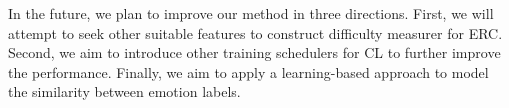 \documentclass[letterpaper]{article} \usepackage{aaai22}  \usepackage{times}  \usepackage{helvet}  \usepackage{courier}  \usepackage[hyphens]{url}  \usepackage{graphicx} \urlstyle{rm} \def\UrlFont{\rm}  \usepackage{natbib}  \usepackage{caption} \DeclareCaptionStyle{ruled}{labelfont=normalfont,labelsep=colon,strut=off} \frenchspacing  \setlength{\pdfpagewidth}{8.5in}  \setlength{\pdfpageheight}{11in}
\begin{document}
In the future, we plan to improve our method in three directions. First, we will attempt to seek other suitable features to construct difficulty measurer for ERC. Second, we aim to introduce other training schedulers for CL to further improve the performance. Finally, we aim to apply a learning-based approach to model the similarity between emotion labels.


 






\end{document}
